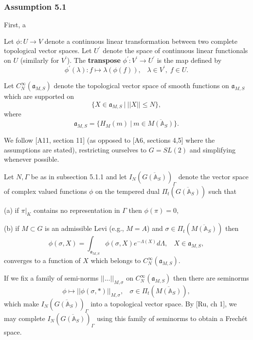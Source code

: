 \subsubsection{Assumption 5.1}

First, a

\begin{definition}
Let $\phi :U\rightarrow V$ denote a continuous linear transformation between
two complete topological vector spaces. Let $U^{\prime }$ denote the space
of continuous linear functionals on $U$ (similarly for $V^{\prime }$). The 
{\bf transpose} $\phi ^{\prime }:V^{\prime }\rightarrow U^{\prime }$ is the
map defined by 
\[
\phi ^{\prime }(\lambda ):f\longmapsto \lambda (\phi (f)),\;\;\;\lambda \in
V^{\prime },\;f\in U. 
\]
\end{definition}

Let $C_N^\infty({\mathfrak{a}}_{M,S})$ denote the topological vector space of
smooth functions on ${\mathfrak{a}}_{M,S}$ which are supported on
\[
\{X\in {\mathfrak{a}}_{M,S}\ |\ ||X||\leq N\},
\]
where
\begin{equation}
{\mathfrak{a}}_{M,S}
=\{H_M(m)\ |\ m\in \overline{M({\mathbb{A}}_S)}\}.
\end{equation}

We follow [A11, section 11] (as opposed to [A6, sections 4,5] where
the assumptions are stated), restricting ourselves to
$G=SL(2)$ and simplifying whenever possible.

 Let $N,\Gamma$ be as in subsection 5.1.1 and let
$I_N(\overline{G({\mathbb{A}}_S)})_\Gamma$ denote the vector
space of complex valued functions $\phi$
on the tempered dual $\Pi_t(\overline{G({\mathbb{A}}_S)})$ such
that

(a) if $\pi|_K$ contains no representation in $\Gamma$ then
$\phi (\pi)=0$,

(b) if $M\subset G$ is an admissible Levi (e.g., $M=A$) and
$\sigma\in \Pi_t(\overline{M({\mathbb{A}}_S)})$ then
\begin{equation}
\phi(\sigma,X)
=\int_{{\mathfrak{a}}_{M,S}}
\phi(\sigma,X)e^{-\Lambda (X)}d\Lambda ,\ \ \ \ X\in {\mathfrak{a}}_{M,S},
\end{equation}
converges to a function of $X$ which belongs to
$C_N^\infty({\mathfrak{a}}_{M,S})$.

If we fix a family of semi-norms $||...||_{M,\sigma}$
on $C_N^\infty({\mathfrak{a}}_{M,S})$ then there are seminorms
\begin{equation}
\phi\longmapsto ||\phi(\sigma,*)||_{M,\sigma},\ \ \ \
\sigma\in \Pi_t(\overline{M({\mathbb{A}}_S)}),
\end{equation}
which make $I_N(\overline{G({\mathbb{A}}_S)})_\Gamma$ into a topological vector space.
By [Ru, ch 1], we may complete
$I_N(\overline{G({\mathbb{A}}_S)})_\Gamma$ using this family of seminorms to
obtain a Frech\'et space.

